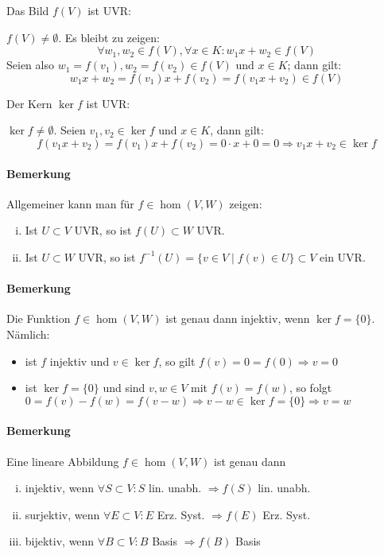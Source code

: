 	Das Bild $f(V)$ ist UVR:
	\begin{addmargin}[25pt]{0pt}
            $f(V) \neq \emptyset$. Es bleibt zu zeigen:
                \[\forall w_1,w_2\in f(V), \forall x\in K: w_1x+w_2 \in f(V)\]
            Seien also $w_1 = f(v_1), w_2 = f(v_2) \in f(V)$ und $x\in K$; dann gilt:
                \[w_1x+w_2 = f(v_1)x+f(v_2) = f(v_1x+v_2)\in f(V)\]
        \end{addmargin}
        
	Der Kern $\ker f$ ist UVR:
	\begin{addmargin}[25pt]{0pt}
            $\ker f\neq \emptyset$. Seien $v_1,v_2\in \ker f$ und $x\in K$, dann gilt:
                \[f(v_1x+v_2) = f(v_1)x+f(v_2) = 0\cdot x + 0 = 0 \Rightarrow v_1x+v_2\in \ker f\]
        \end{addmargin}

\paragraph{Bemerkung}
	Allgemeiner kann man für $f\in \hom (V,W)$ zeigen:
		\begin{enumerate}[(i)]
			\item Ist $U\subset V$ UVR, so ist $f(U)\subset W$ UVR.
			\item Ist $U\subset W$ UVR, so ist $f^{-1}(U) = \{v\in V\mid f(v) \in U \}\subset V$ ein UVR.
		\end{enumerate}

\paragraph{Bemerkung}
	Die Funktion $f\in \hom (V,W)$ ist genau dann injektiv, wenn $\ker f = \{0\}$. Nämlich:
		\begin{itemize}
			\item ist $f$ injektiv und $v\in \ker f$, so gilt $f(v) = 0 = f(0) \Rightarrow v=0$
			\item ist $\ker f = \{ 0 \}$ und sind $v,w \in V$ mit $f(v) = f(w)$, so folgt $0=f(v)-f(w) = f(v-w) \Rightarrow v-w\in \ker f = \{0\} \Rightarrow v = w$
		\end{itemize}

\paragraph{Bemerkung}
	Eine lineare Abbildung $ f\in \hom (V,W) $ ist genau dann
		\begin{enumerate}[(i)]
			\item injektiv, wenn $ \forall S\subset V: S$ lin. unabh. $ \Rightarrow f(S) $ lin. unabh.
			\item surjektiv, wenn $ \forall E \subset V:E $ Erz. Syst. $ \Rightarrow f(E)$ Erz. Syst.
			\item bijektiv, wenn $ \forall B\subset V: B$ Basis $ \Rightarrow f(B)$ Basis
		\end{enumerate}

